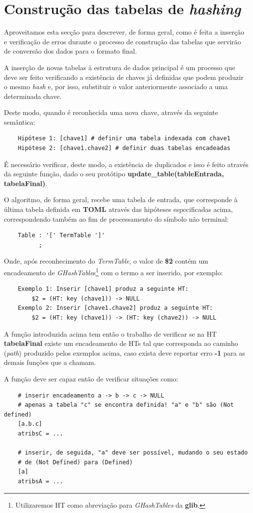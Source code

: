 \documentclass[a4paper,12pt]{report}
\begin{document}
\section{Construção das tabelas de \textit{hashing}}

Aproveitamos esta secção para descrever, de forma geral, como é feita a inserção e verificação de erros durante o processo de construção das tabelas que servirão de conversão dos dados para o formato final.
\par
A inserção de novas tabelas à estrutura de dados principal é um processo que deve ser feito verificando a existência de chaves já definidas que podem produzir o mesmo \textit{hash} e, por isso, substituir o valor anteriormente associado a uma determinada chave.
\par
Deste modo, quando é reconhecida uma nova chave, através da seguinte semântica:
\begin{verbatim}
    Hipótese 1: [chave1] # definir uma tabela indexada com chave1
    Hipótese 2: [chave1.chave2] # definir duas tabelas encadeadas
\end{verbatim}

É necessário verificar, deste modo, a existência de duplicados e isso é feito através da seguinte função, dado o seu protótipo \textbf{update\_table(tableEntrada, tabelaFinal)}.
\par
O algoritmo, de forma geral, recebe uma tabela de entrada, que corresponde à última tabela definida em \textbf{TOML} através das hipóteses especificadas acima, correspondendo também ao fim de processamento do símbolo não terminal: 
\begin{verbatim}
    Table : '[' TermTable ']' 
          ;
\end{verbatim}
Onde, após reconhecimento do \textit{TermTable}, o valor de \textbf{\$2} contém um encadeamento de \textit{GHashTable}s\footnote{Utilizaremos HT como abreviação para \textit{GHashTables} da \textbf{glib}.} com o termo a ser inserido, por exemplo:
\begin{verbatim}
    Exemplo 1: Inserir [chave1] produz a seguinte HT:
        $2 = (HT: key (chave1)) -> NULL
    Exemplo 2: Inserir [chave1.chave2] produz a seguinte HT:
        $2 = (HT: key (chave1)) -> (HT: key (chave2)) -> NULL
\end{verbatim}

A função introduzida acima tem então o trabalho de verificar se na HT \textbf{tabelaFinal} existe um encadeamento de HTs tal que corresponda ao caminho (\textit{path}) produzido pelos exemplos acima, caso exista deve reportar erro \textbf{-1} para as demais funções que a chamam.
\par
A função deve ser capaz então de verificar situações como:
\begin{verbatim}
    # inserir encadeamento a -> b -> c -> NULL
    # apenas a tabela "c" se encontra definida! "a" e "b" são (Not defined)
    [a.b.c]
    atribsC = ...
    
    # inserir, de seguida, "a" deve ser possível, mudando o seu estado
    # de (Not Defined) para (Defined)
    [a] 
    atribsA = ...
\end{verbatim}
\end{document}
